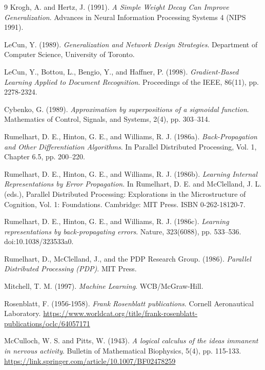 \begin{thebibliography}{9}
Krogh, A. and Hertz, J. (1991).
\textit{A Simple Weight Decay Can Improve Generalization}.
Advances in Neural Information Processing Systems 4 (NIPS 1991).

LeCun, Y. (1989).
\textit{Generalization and Network Design Strategies}.
Department of Computer Science, University of Toronto.

LeCun, Y., Bottou, L., Bengio, Y., and Haffner, P. (1998).
\textit{Gradient-Based Learning Applied to Document Recognition}.
Proceedings of the IEEE, 86(11), pp. 2278-2324.

Cybenko, G. (1989).
\textit{Approximation by superpositions of a sigmoidal function}.
Mathematics of Control, Signals, and Systems, 2(4), pp. 303–314.

Rumelhart, D. E., Hinton, G. E., and Williams, R. J. (1986a).
\textit{Back-Propagation and Other Differentiation Algorithms}.
In Parallel Distributed Processing, Vol. 1, Chapter 6.5, pp. 200–220.

Rumelhart, D. E., Hinton, G. E., and Williams, R. J. (1986b).
\textit{Learning Internal Representations by Error Propagation}.
In Rumelhart, D. E. and McClelland, J. L. (eds.), Parallel Distributed Processing: Explorations in the Microstructure of Cognition, Vol. 1: Foundations. Cambridge: MIT Press. ISBN 0-262-18120-7.

Rumelhart, D. E., Hinton, G. E., and Williams, R. J. (1986c).
\textit{Learning representations by back-propagating errors}.
Nature, 323(6088), pp. 533–536. doi:10.1038/323533a0.

Rumelhart, D., McClelland, J., and the PDP Research Group. (1986).
\textit{Parallel Distributed Processing (PDP)}.
MIT Press.

Mitchell, T. M. (1997).
\textit{Machine Learning}.
WCB/McGraw-Hill.

Rosenblatt, F. (1956-1958).
\textit{Frank Rosenblatt publications}.
Cornell Aeronautical Laboratory.
\url{https://www.worldcat.org/title/frank-rosenblatt-publications/oclc/64057171}

McCulloch, W. S. and Pitts, W. (1943).
\textit{A logical calculus of the ideas immanent in nervous activity}.
Bulletin of Mathematical Biophysics, 5(4), pp. 115-133.
\url{https://link.springer.com/article/10.1007/BF02478259}


\end{thebibliography}

